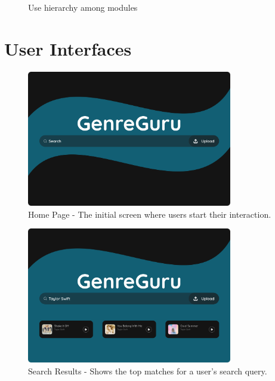 \documentclass[12pt, titlepage]{article}
\begin{document}

\begin{figure}[H]
\centering
\caption{Use hierarchy among modules}
\label{FigUH}
\end{figure}


\section{User Interfaces}


\begin{figure}[h!]
    \centering
    \includegraphics[width=0.8\textwidth]{UI_Images/Home_Page.png}
    \caption{Home Page - The initial screen where users start their interaction.}
    \label{fig:home_page}
\end{figure}

\begin{figure}[h!]
    \centering
    \includegraphics[width=0.8\textwidth]{UI_Images/Search_Results.png}
    \caption{Search Results - Shows the top matches for a user’s search query.}
    \label{fig:search_results}
\end{figure}
\end{document}
